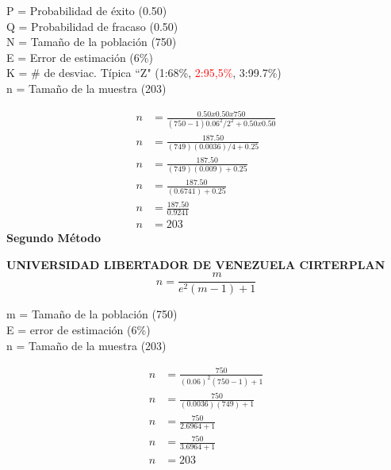 \documentclass[12pt, a4paper, nofontenc, numbers=endperiod]{apa7}
\begin{document}
{\begin{flushleft}
	
	\hspace*{4cm}P = Probabilidad de éxito (0.50) \\
	\hspace*{4cm}Q = Probabilidad de fracaso (0.50) \\
	\hspace*{4cm}N = Tamaño de la población (750) \\
	\hspace*{4cm}E = Error de estimación (6\%) \\
	\hspace*{4cm}K = \# de desviac. Típica ``Z" (1:68\%, \textcolor {red}{2:95,5\%}, 3:99.7\%)\\
	\hspace*{4cm}n = Tamaño de la muestra (203)
\end{flushleft}
\vspace*{-0.5cm}
\begin{align*}
n &= \frac{0.50x0.50x750}{(750-1) 0.06^2 / 2^2 + 0.50x0.50}\\
n &= \frac{187.50}{(749)(0.0036) / 4 + 0.25}\\
n &= \frac{187.50}{(749)(0.009) + 0.25}\\
n &= \frac{187.50}{(0.6741) + 0.25}\\
n &= \frac{187.50}{0.9241}\\
n &= 203
\end{align*}
\newpage
\setlength{\parindent}{1.27cm}\textbf{Segundo Método}

\setlength{\parindent}{1.27cm}\textbf{UNIVERSIDAD LIBERTADOR DE VENEZUELA CIRTERPLAN}
\vspace*{-0.8cm}
\begin{equation}
n = \frac{m}{e^2 (m-1) + 1}
\end{equation}

\begin{flushleft}
	\hspace*{4cm}m = Tamaño de la población (750) \\
	\hspace*{4cm}E = error de estimación (6\%) \\
	\hspace*{4cm}n = Tamaño de la muestra (203) 
\end{flushleft}
\vspace*{-0.5cm}	
\begin{align*}
n &= \frac{750}{(0.06)^2 (750 - 1)+1}\\
n &= \frac{750}{(0.0036) (749)+1}\\
n &= \frac{750}{2.6964+1} \\
n &= \frac{750}{3.6964+1} \\
n &= 203
\end{align*}

}
\end{document}
